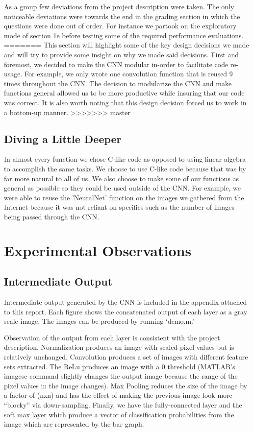 \documentclass[11pt,english]{article}
\begin{document}
As a group few deviations from the project description were taken. The only noticeable deviations were towards the end in the grading section in which the questions were done out of order. For instance we partook on the exploratory mode of section 1e before testing some of the required performance evaluations.
=======
This section will highlight some of the key design decisions we made and will try to provide some insight on why we made said decisions. First and foremost, we decided to make the CNN modular in-order to facilitate code re-usage. For example, we only wrote one convolution function that is reused 9 times throughout the CNN. The decision to modularize the CNN and make functions general allowed us to be more productive while insuring that our code was correct. It is also worth noting that this design decision forced us to work in a bottom-up manner.
>>>>>>> master

\newpage


\subsection{Diving a Little Deeper}
In almost every function we chose C-like code as opposed to using linear algebra to accomplish the same tasks. We choose to use C-like code because that was by far more natural to all of us. We also choose to make some of our functions as general as possible so they could be used outside of the CNN. For example, we were able to reuse the 'NeuralNet' function on the images we gathered from the Internet because it was not reliant on specifics such as the number of images being passed through the CNN.

\section{Experimental Observations}

\subsection{Intermediate Output}

Intermediate output generated by the CNN is included in the appendix attached to this report.  Each figure shows the concatenated output of each layer as a gray scale image.  The images can be produced by running `demo.m.'

Observation of the output from each layer is consistent with the project description.  Normalization produces an image with scaled pixel values but is relatively unchanged.  Convolution produces a set of images with different feature sets extracted.  The ReLu produces an image with a 0 threshold (MATLAB's imagesc command slightly changes the output image because the range of the pixel values in the image changes).  Max Pooling reduces the size of the image by a factor of (nxn) and has the effect of making the previous image look more ``blocky'' via down-sampling.  Finally, we have the fully-connected layer and the soft max layer which produce a vector of classification probabilities from the image which are represented by the bar graph.
\end{document}
